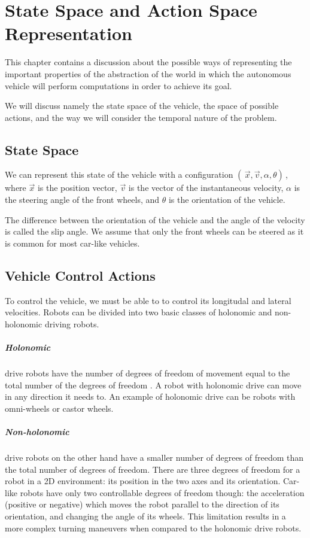 \chapter{State Space and Action Space Representation}

This chapter contains a discussion about the possible ways of representing the important properties of the abstraction of the world in which the autonomous vehicle will perform computations in order to achieve its goal.

We will discuss namely the state space of the vehicle, the space of possible actions, and the way we will consider the temporal nature of the problem.

\section{State Space}

We can represent this state of the vehicle with a configuration $( \, \vec{x}, \vec{v}, \alpha, \theta ) \,$, where $\vec{x}$ is the position vector, $\vec{v}$ is the vector of the instantaneous velocity, $\alpha$ is the steering angle of the front wheels, and $\theta$ is the orientation of the vehicle.

The difference between the orientation of the vehicle and the angle of the velocity is called the slip angle. We assume that only the front wheels can be steered as it is common for most car-like vehicles.

\section{Vehicle Control Actions}

To control the vehicle, we must be able to to control its longitudal and lateral velocities. Robots can be divided into two basic classes of holonomic and non-holonomic driving robots.

\paragraph{Holonomic} drive robots have the number of degrees of freedom of movement equal to the total number of the degrees of freedom \cite{}. A robot with holonomic drive can move in any direction it needs to. An example of holonomic drive can be robots with omni-wheels or castor wheels.

\paragraph{Non-holonomic} drive robots on the other hand have a smaller number of degrees of freedom than the total number of degrees of freedom. There are three degrees of freedom for a robot in a 2D environment: its position in the two axes and its orientation. Car-like robots have only two controllable degrees of freedom though: the acceleration (positive or negative) which moves the robot parallel to the direction of its orientation, and changing the angle of its wheels. This limitation results in a more complex turning maneuvers when compared to the holonomic drive robots.

